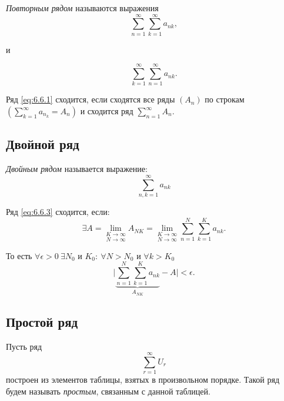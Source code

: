 \begin{definition}
    \emph{Повторным рядом} называются выражения
    \begin{equation}\label{eq:6.6.1}
        \sum_{n=1}^{\infty}\sum_{k=1}^{\infty}a_{nk},
    \end{equation}
    \begin{center}
        и
    \end{center}
    \begin{equation}\label{eq:6.6.2}
        \sum_{k=1}^{\infty}\sum_{n=1}^{\infty}a_{nk}.
    \end{equation}

    Ряд \ref{eq:6.6.1} сходится, если сходятся все ряды $(A_n)$ по строкам $(\sum_{k=1}^{\infty}a_{n_k} = A_n)$ и сходится ряд $ \sum_{n=1}^{\infty}A_n $.
\end{definition}

\subsection{Двойной ряд}

\begin{definition}
    \emph{Двойным рядом} называется выражение:
    \begin{equation}\label{eq:6.6.3}
        \sum_{n,k = 1}^{\infty} a_{nk}
    \end{equation}

    Ряд \ref{eq:6.6.3} сходится, если:
    \[
        \exists A = \underset{N\rightarrow\infty}{\underset{K\rightarrow\infty}{\lim}}A_{NK} = \underset{N\rightarrow\infty}{\underset{K\rightarrow\infty}{\lim}}\sum_{n=1}^{N}\sum_{k=1}^{K}a_{nk}.
    \]

    То есть $\forall \epsilon > 0 \ \exists N_0$ и $K_0: \ \forall N > N_0$ и $\forall k > K_0$
    \[
        \bigg|\underbrace{\sum_{n=1}^{N}\sum_{k=1}^{K}a_{nk}}_{A_{NK}} - A\bigg| < \epsilon.
    \]
\end{definition}

\subsection{Простой ряд}

\begin{definition}
    Пусть ряд
    \begin{equation}\label{eq:6.6.4}
        \sum_{r=1}^{\infty}U_r
    \end{equation}
    построен из элементов таблицы, взятых в произвольном порядке. Такой ряд будем называть \emph{простым}, связанным с данной таблицей.
\end{definition}

